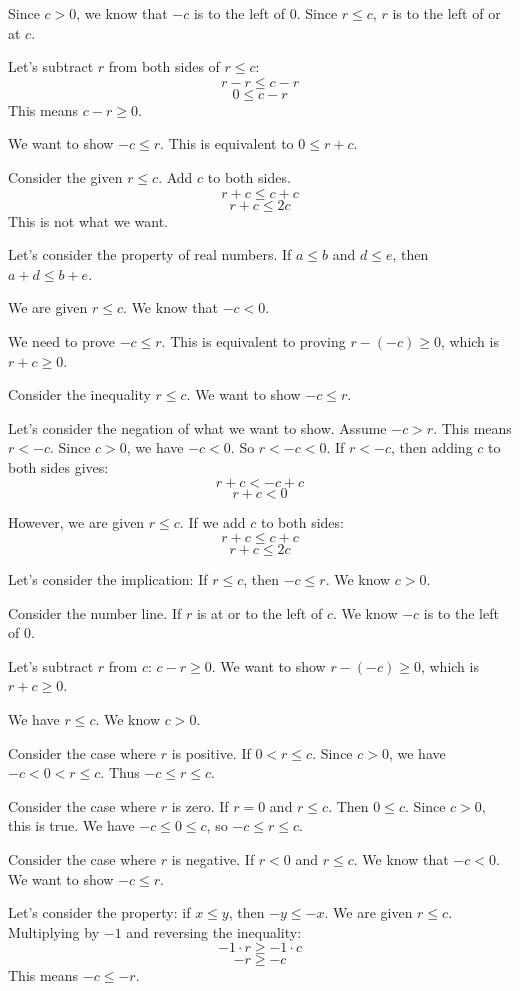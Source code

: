 \documentclass{article}
\begin{document}
Since $c > 0$, we know that $-c$ is to the left of $0$.
Since $r \le c$, $r$ is to the left of or at $c$.

Let's subtract $r$ from both sides of $r \le c$:
$$ r - r \le c - r $$
$$ 0 \le c - r $$
This means $c - r \ge 0$.

We want to show $-c \le r$.
This is equivalent to $0 \le r + c$.

Consider the given $r \le c$.
Add $c$ to both sides.
$$ r + c \le c + c $$
$$ r + c \le 2c $$
This is not what we want.

Let's consider the property of real numbers. If $a \le b$ and $d \le e$, then $a+d \le b+e$.

We are given $r \le c$.
We know that $-c < 0$.

We need to prove $-c \le r$.
This is equivalent to proving $r - (-c) \ge 0$, which is $r+c \ge 0$.

Consider the inequality $r \le c$.
We want to show $-c \le r$.

Let's consider the negation of what we want to show. Assume $-c > r$.
This means $r < -c$.
Since $c > 0$, we have $-c < 0$. So $r < -c < 0$.
If $r < -c$, then adding $c$ to both sides gives:
$$ r + c < -c + c $$
$$ r + c < 0 $$

However, we are given $r \le c$.
If we add $c$ to both sides:
$$ r + c \le c + c $$
$$ r + c \le 2c $$

Let's consider the implication: If $r \le c$, then $-c \le r$.
We know $c > 0$.

Consider the number line.
If $r$ is at or to the left of $c$.
We know $-c$ is to the left of $0$.

Let's subtract $r$ from $c$: $c-r \ge 0$.
We want to show $r-(-c) \ge 0$, which is $r+c \ge 0$.

We have $r \le c$.
We know $c>0$.

Consider the case where $r$ is positive. If $0 < r \le c$. Since $c > 0$, we have $-c < 0 < r \le c$. Thus $-c \le r \le c$.

Consider the case where $r$ is zero. If $r=0$ and $r \le c$. Then $0 \le c$. Since $c>0$, this is true. We have $-c \le 0 \le c$, so $-c \le r \le c$.

Consider the case where $r$ is negative. If $r < 0$ and $r \le c$.
We know that $-c < 0$.
We want to show $-c \le r$.

Let's consider the property: if $x \le y$, then $-y \le -x$.
We are given $r \le c$.
Multiplying by $-1$ and reversing the inequality:
$$ -1 \cdot r \ge -1 \cdot c $$
$$ -r \ge -c $$
This means $-c \le -r$.
\end{document}
